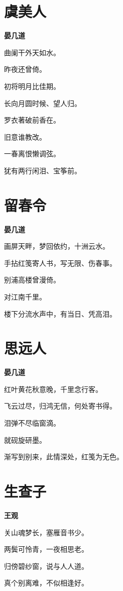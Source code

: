 \documentclass[12pt,a4paper]{ctexbook}
\begin{document}
\section{虞美人}
\textbf{晏几道}\par\vspace{0.5em}
曲阑干外天如水。\par
昨夜还曾倚。\par
初将明月比佳期。\par
长向月圆时候、望人归。\par
罗衣著破前香在。\par
旧意谁教改。\par
一春离恨懒调弦。\par
犹有两行闲泪、宝筝前。\par

\section{留春令}
\textbf{晏几道}\par\vspace{0.5em}
画屏天畔，梦回依约，十洲云水。\par
手拈红笺寄人书，写无限、伤春事。\par
别浦高楼曾漫倚。\par
对江南千里。\par
楼下分流水声中，有当日、凭高泪。\par

\section{思远人}
\textbf{晏几道}\par\vspace{0.5em}
红叶黄花秋意晚，千里念行客。\par
飞云过尽，归鸿无信，何处寄书得。\par
泪弹不尽临窗滴。\par
就砚旋研墨。\par
渐写到别来，此情深处，红笺为无色。\par

\section{生查子}
\textbf{王观}\par\vspace{0.5em}
关山魂梦长，塞雁音书少。\par
两鬓可怜青，一夜相思老。\par
归傍碧纱窗，说与人人道。\par
真个别离难，不似相逢好。\par
\end{document}
